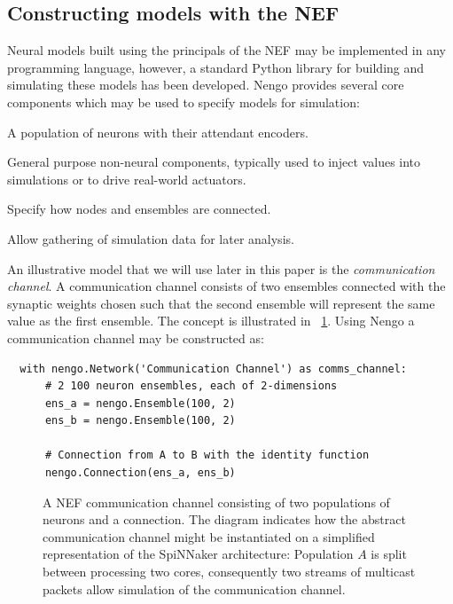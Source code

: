 \documentclass[conference]{IEEEtran}
\begin{document}
%
%

  \subsection{Constructing models with the NEF}
\label{sef:background/constructing}
Neural models built using the principals of the NEF may be implemented in any programming language, however, a standard Python library for building and simulating these models has been developed. Nengo \parencite{Bekolay2014} provides several core components which may be used to specify models for simulation:

  \begin{description}
    \item[Ensembles] A population of neurons with their attendant encoders.
    \item[Nodes] General purpose non-neural components, typically used to inject values into simulations or to drive real-world actuators.
    \item[Connections] Specify how nodes and ensembles are connected.
    \item[Probes] Allow gathering of simulation data for later analysis.
  \end{description}

  An illustrative model that we will use later in this paper is the \textit{communication channel}. A communication channel consists of two ensembles connected with the synaptic weights chosen such that the second ensemble will represent the same value as the first ensemble. The concept is illustrated in \figurename~\ref{fig:background/comms-channel}. Using Nengo a communication channel may be constructed as:

  \begin{lstlisting}
  with nengo.Network('Communication Channel') as comms_channel:
      # 2 100 neuron ensembles, each of 2-dimensions
      ens_a = nengo.Ensemble(100, 2)
      ens_b = nengo.Ensemble(100, 2)

      # Connection from A to B with the identity function
      nengo.Connection(ens_a, ens_b)
  \end{lstlisting}

  \begin{figure}
    \centering
    
    \caption{A NEF communication channel consisting of two populations of neurons and a connection.
             The diagram indicates how the abstract communication channel might be instantiated on a simplified representation of the SpiNNaker architecture:
             Population $A$ is split between processing two cores, consequently two streams of multicast packets allow simulation of the communication channel.
    }
    \label{fig:background/comms-channel}
  \end{figure}
\end{document}
